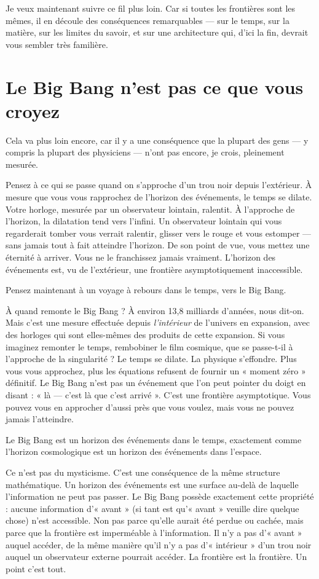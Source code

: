 \documentclass[11pt, twoside, openright]{book}
\begin{document}
Je veux maintenant suivre ce fil plus loin. Car si toutes les frontières sont les mêmes, il en découle des conséquences remarquables --- sur le temps, sur la matière, sur les limites du savoir, et sur une architecture qui, d'ici la fin, devrait vous sembler très familière.


\section*{Le Big Bang n'est pas ce que vous croyez}

Cela va plus loin encore, car il y a une conséquence que la plupart des gens --- y compris la plupart des physiciens --- n'ont pas encore, je crois, pleinement mesurée.

Pensez à ce qui se passe quand on s'approche d'un trou noir depuis l'extérieur. À mesure que vous vous rapprochez de l'horizon des événements, le temps se dilate. Votre horloge, mesurée par un observateur lointain, ralentit. À l'approche de l'horizon, la dilatation tend vers l'infini. Un observateur lointain qui vous regarderait tomber vous verrait ralentir, glisser vers le rouge et vous estomper --- sans jamais tout à fait atteindre l'horizon. De son point de vue, vous mettez une éternité à arriver. Vous ne le franchissez jamais vraiment. L'horizon des événements est, vu de l'extérieur, une frontière asymptotiquement inaccessible.

Pensez maintenant à un voyage à rebours dans le temps, vers le Big Bang.

À quand remonte le Big Bang ? À environ 13,8 milliards d'années, nous dit-on. Mais c'est une mesure effectuée depuis \textit{l'intérieur} de l'univers en expansion, avec des horloges qui sont elles-mêmes des produits de cette expansion. Si vous imaginez remonter le temps, rembobiner le film cosmique, que se passe-t-il à l'approche de la singularité ? Le temps se dilate. La physique s'effondre. Plus vous vous approchez, plus les équations refusent de fournir un « moment zéro » définitif. Le Big Bang n'est pas un événement que l'on peut pointer du doigt en disant : « là --- c'est là que c'est arrivé ». C'est une frontière asymptotique. Vous pouvez vous en approcher d'aussi près que vous voulez, mais vous ne pouvez jamais l'atteindre.

Le Big Bang est un horizon des événements dans le temps, exactement comme l'horizon cosmologique est un horizon des événements dans l'espace.

Ce n'est pas du mysticisme. C'est une conséquence de la même structure mathématique. Un horizon des événements est une surface au-delà de laquelle l'information ne peut pas passer. Le Big Bang possède exactement cette propriété : aucune information d'« avant » (si tant est qu'« avant » veuille dire quelque chose) n'est accessible. Non pas parce qu'elle aurait été perdue ou cachée, mais parce que la frontière est imperméable à l'information. Il n'y a pas d'« avant » auquel accéder, de la même manière qu'il n'y a pas d'« intérieur » d'un trou noir auquel un observateur externe pourrait accéder. La frontière est la frontière. Un point c'est tout.
\end{document}
